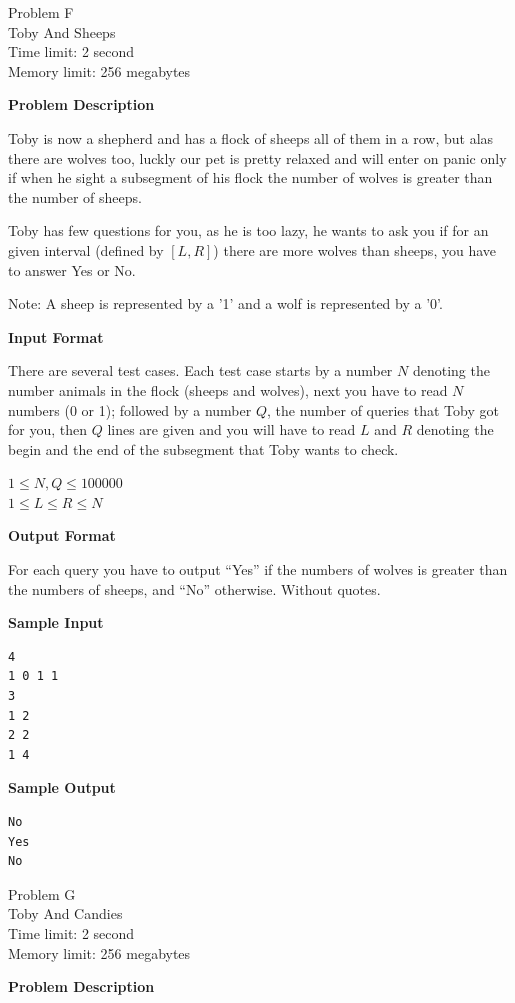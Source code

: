 \documentclass[11pt]{article}
\begin{document}
\newpage
        \begin{center}
            {\LARGE Problem F}\\
            {\Large Toby And Sheeps}\\
            {Time limit: 2 second}\\
            {Memory limit: 256 megabytes}
        \end{center}\textbf{\large Problem Description}

Toby is now a shepherd and has a flock of sheeps all of them in a row, but alas there are wolves too, luckly our pet is pretty relaxed and will enter on panic only if when he sight a subsegment of his flock the number of wolves is greater than the number of sheeps.

Toby has few questions for you, as he is too lazy, he wants to ask you if for an given interval  (defined by $[L, R]$) there are more wolves than sheeps, you have to answer Yes or No.

Note: A sheep is represented by a '1' and a wolf is represented by a '0'.

\textbf{\large Input Format}

There are several test cases.
Each test case starts by a number $N$ denoting the number animals in the flock (sheeps and wolves), next you have to read $N$ numbers (0 or 1); followed by a number $Q$, the number of queries that Toby got for you, then $Q$ lines are given and you will have to read $L$ and $R$ denoting the begin and the end of the subsegment that Toby wants to check.

$1 \le N, Q \le 100000$ \\
$1 \le L \le R \le N$

\textbf{\large Output Format}

For each query you have to output ``Yes'' if the numbers of wolves is greater than the numbers of sheeps, and ``No'' otherwise. Without quotes.

\textbf{\large Sample Input}

\begin{verbatim}
4
1 0 1 1
3
1 2
2 2
1 4
\end{verbatim}

\textbf{\large Sample Output}

\begin{verbatim}
No
Yes
No
\end{verbatim}

\newpage

        \begin{center}
            {\LARGE Problem G}\\
            {\Large Toby And Candies}\\
            {Time limit: 2 second}\\
            {Memory limit: 256 megabytes}
        \end{center}\textbf{\large Problem Description}
\end{document}
